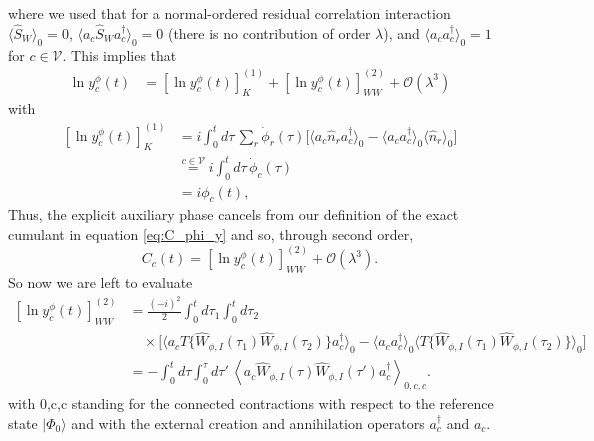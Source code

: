 where we used that for a normal-ordered residual correlation interaction $\langle\hat S_W\rangle_0=0$, $\langle a_c\hat S_Wa_c^\dagger\rangle_0=0$ (there is no contribution of order $\lambda$), and $\langle a_ca_c^\dagger\rangle_0=1$ for $c\in\mathcal V$. This 
implies that
\begin{align}
    \ln y_c^\phi(t)
    &=
    \left[\ln y_c^\phi(t)\right]_{K}^{(1)}
    +
    \left[\ln y_c^\phi(t)\right]_{WW}^{(2)}
    +
    \mathcal O(\lambda^3)\end{align}
with
\begin{align}
    \left[\ln y_c^\phi(t)\right]_{K}^{(1)}
    &=
    i\int_0^t d\tau\,
    \sum_r\dot{\phi}_r(\tau)
    \Big[
        \langle
        a_c\hat n_r a_c^\dagger
        \rangle_0
        -
        \langle
        a_ca_c^\dagger
        \rangle_0
        \langle\hat n_r\rangle_0
    \Big]\\
&\overset{c\in\mathcal V}{=}
    i\int_0^t d\tau\,
    \dot{\phi}_c(\tau) \\
&= i\phi_c(t),
\end{align}
Thus, the explicit auxiliary phase cancels from our definition of the exact cumulant in equation \eqref{eq:C_phi_y} and so, through second order,
\begin{equation}
    {
    C_c(t)
    =
    \left[\ln y_c^\phi(t)\right]_{WW}^{(2)}
    +
    \mathcal O(\lambda^3).
    }
    \label{eq:C_equals_WW_second}
\end{equation}
So now we are left to evaluate
\begin{align}
    \left[\ln y_c^\phi(t)\right]_{WW}^{(2)}
    &=
    \frac{(-i)^2}{2}
    \int_0^t d\tau_1
    \int_0^t d\tau_2
    \nonumber\\
    &\quad\times
    \Big[
        \langle
        a_c
        T\{
        \hat W_{\phi,I}(\tau_1)
        \hat W_{\phi,I}(\tau_2)
        \}
        a_c^\dagger
        \rangle_0 -
        \langle a_ca_c^\dagger\rangle_0
        \langle
        T\{
        \hat W_{\phi,I}(\tau_1)
        \hat W_{\phi,I}(\tau_2)
        \}
        \rangle_0
    \Big]\\
&    =
    -
    \int_0^t d\tau
    \int_0^\tau d\tau'\,
    \left\langle
    a_c
    \hat W_{\phi,I}(\tau)
    \hat W_{\phi,I}(\tau')
    a_c^\dagger
    \right\rangle_{0,c,c}.
\end{align}
with 0,c,c standing for the connected contractions with respect to the reference state $|\Phi_0\rangle$ and with the external creation and annihilation operators $a_c^\dagger$ and $a_c$.

